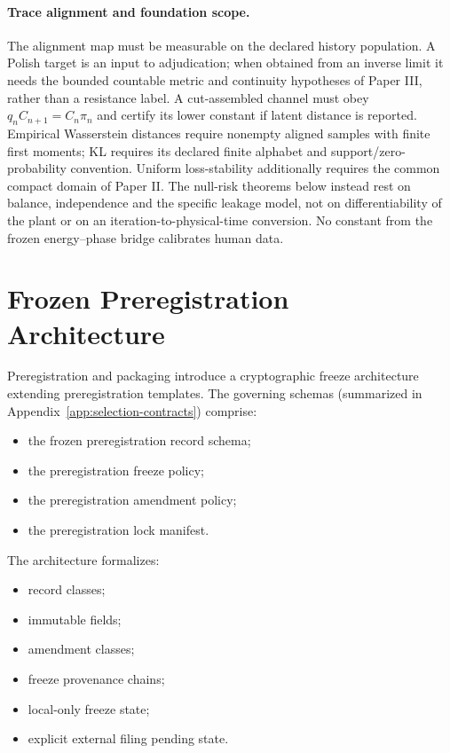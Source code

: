 \documentclass[11pt,a4paper]{article}
\begin{document}
\paragraph{Trace alignment and foundation scope.}
The alignment map must be measurable on the declared history population.
A Polish target is an input to adjudication; when obtained from an inverse
limit it needs the bounded countable metric and continuity hypotheses of
Paper III, rather than a resistance label. A cut-assembled channel must obey
$q_nC_{n+1}=C_n\pi_n$ and certify its lower constant if latent distance is
reported. Empirical Wasserstein distances require nonempty aligned samples
with finite first moments; KL requires its declared finite alphabet and
support/zero-probability convention. Uniform loss-stability additionally
requires the common compact domain of Paper II. The null-risk theorems below
instead rest on balance, independence and the specific leakage model, not
on differentiability of the plant or on an iteration-to-physical-time conversion.
No constant from the frozen energy--phase bridge calibrates human data.

\section{Frozen Preregistration Architecture}

Preregistration and packaging introduce a cryptographic freeze architecture extending preregistration
templates. The governing schemas (summarized in Appendix~\ref{app:selection-contracts}) comprise:

\begin{itemize}
\item the frozen preregistration record schema;
\item the preregistration freeze policy;
\item the preregistration amendment policy;
\item the preregistration lock manifest.
\end{itemize}

The architecture formalizes:

\begin{itemize}
\item record classes;
\item immutable fields;
\item amendment classes;
\item freeze provenance chains;
\item local-only freeze state;
\item explicit external filing pending state.
\end{itemize}
\end{document}
